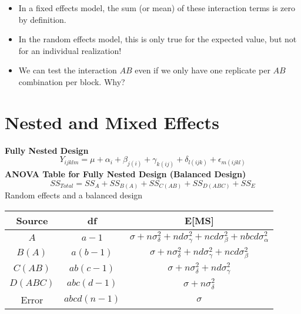 \documentclass[a4paper]{article}
\begin{document}
\begin{itemize}
    \item In a fixed effects model, the sum (or mean) of these interaction terms is zero by definition.
    \item In the random effects model, this is only true for the expected value, but not for an individual realization!
    \item We can test the interaction $AB$ even if we only have one replicate per $AB$ combination per block. Why?
\end{itemize}

\section{Nested and Mixed Effects}
\textbf{Fully Nested Design}
\[Y_{ijklm}=\mu+\alpha_i+\beta_{j(i)}+\gamma_{k(ij)}+\delta_{l(ijk)}+\epsilon_{m(ijkl)} \]
\textbf{ANOVA Table for Fully Nested Design (Balanced Design)}
\[SS_{Total}=SS_A+SS_{B(A)}+SS_{C(AB)}+SS_{D(ABC)}+SS_E \]
Random effects and a balanced design
\begin{table}[!htbp]
    \centering
    \begin{tabular}{c|c|c}
    \textbf{Source} & \textbf{df} & \textbf{E[MS]} \\
    \hline
    $A$ & $a-1$ & $\sigma+n\sigma_{\delta}^2+nd\sigma_{\gamma}^2+ncd\sigma_{\beta}^2+nbcd\sigma_{\alpha}^2$ \\
    \hline
    $B(A)$ & $a(b-1)$ & $\sigma+n\sigma_{\delta}^2+nd\sigma_{\gamma}^2+ncd\sigma_{\beta}^2$ \\
    \hline
    $C(AB)$ & $ab(c-1)$ & $\sigma+n\sigma_{\delta}^2+nd\sigma_{\gamma}^2$ \\
    \hline 
    $D(ABC)$ & $abc(d-1)$ & $\sigma+n\sigma_{\delta}^2$ \\
    \hline
    Error & $abcd(n-1)$ & $\sigma$
    \end{tabular}
\end{table}
\end{document}
